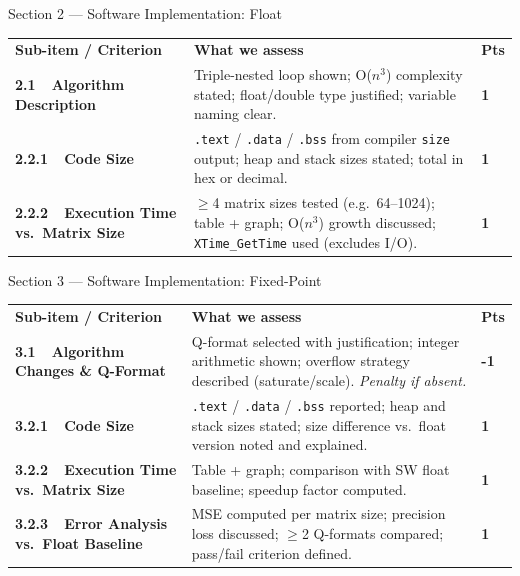 \documentclass[10pt,aspectratio=169]{beamer}
\begin{document}
\begin{frame}{Section 2 --- Software Implementation: Float}
\setlength{\extrarowheight}{2pt}\setlength{\tabcolsep}{4pt}
\begin{tabular}{m{3.8cm}m{8.8cm}>{\raggedleft\arraybackslash}m{1.4cm}}
\rowcolor{C2}
\textbf{\color{white}Sub-item / Criterion} &
\textbf{\color{white}What we assess} &
\textbf{\color{white}Pts} \tabularnewline
\textbf{2.1\ \ Algorithm Description} &
  {\color{TxtMd}Triple-nested loop shown; O($n^3$) complexity stated; float/double type justified; variable naming clear.} &
  \textbf{\color{C2}1} \tabularnewline
\textbf{2.2.1\ \ Code Size} &
  {\color{TxtMd}\texttt{.text} / \texttt{.data} / \texttt{.bss} from compiler \texttt{size} output; heap and stack sizes stated; total in hex or decimal.} &
  \textbf{\color{C2}1} \tabularnewline
\textbf{2.2.2\ \ Execution Time vs.\ Matrix Size} &
  {\color{TxtMd}$\geq$4 matrix sizes tested (e.g.\ 64--1024); table + graph; O($n^3$) growth discussed; \texttt{XTime\_GetTime} used (excludes I/O).} &
  \textbf{\color{C2}1} \tabularnewline
\end{tabular}
\end{frame}

\begin{frame}{Section 3 --- Software Implementation: Fixed-Point}
\setlength{\extrarowheight}{2pt}\setlength{\tabcolsep}{4pt}
\begin{tabular}{m{3.8cm}m{8.8cm}>{\raggedleft\arraybackslash}m{1.4cm}}
\rowcolor{C3}
\textbf{\color{white}Sub-item / Criterion} &
\textbf{\color{white}What we assess} &
\textbf{\color{white}Pts} \tabularnewline
\textbf{3.1\ \ Algorithm Changes \& Q-Format} &
  {\color{TxtMd}Q-format selected with justification; integer arithmetic shown; overflow strategy described (saturate/scale). \textit{Penalty if absent.}} &
  \textbf{\color{Orange}-1} \tabularnewline
\textbf{3.2.1\ \ Code Size} &
  {\color{TxtMd}\texttt{.text} / \texttt{.data} / \texttt{.bss} reported; heap and stack sizes stated; size difference vs.\ float version noted and explained.} &
  \textbf{\color{C3}1} \tabularnewline
\textbf{3.2.2\ \ Execution Time vs.\ Matrix Size} &
  {\color{TxtMd}Table + graph; comparison with SW float baseline; speedup factor computed.} &
  \textbf{\color{C3}1} \tabularnewline
\textbf{3.2.3\ \ Error Analysis vs.\ Float Baseline} &
  {\color{TxtMd}MSE computed per matrix size; precision loss discussed; $\geq$2 Q-formats compared; pass/fail criterion defined.} &
  \textbf{\color{C3}1} \tabularnewline
\end{tabular}
\end{frame}
\end{document}
